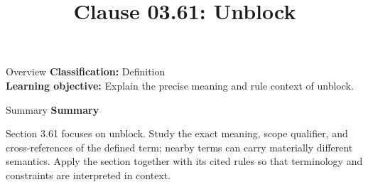 \documentclass[10pt,letterpaper]{article}
\title{Clause 03.61: Unblock}
\author{}
\date{}
\begin{document}
\maketitle
\begin{CornellOverviewBox}{Overview}
\textbf{Classification:} Definition\\[2pt]
\textbf{Learning objective:} Explain the precise meaning and rule context of unblock.
\end{CornellOverviewBox}\begin{CornellSummaryBox}{Summary}
{\sffamily\bfseries\color{Accent} Summary}\par\vspace{3pt}Section 3.61 focuses on unblock. Study the exact meaning, scope qualifier, and cross-references of the defined term; nearby terms can carry materially different semantics. Apply the section together with its cited rules so that terminology and constraints are interpreted in context.
\end{CornellSummaryBox}
\end{document}
